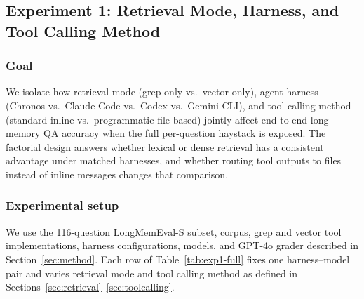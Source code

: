 \documentclass[sigconf,nonacm]{acmart}
\begin{document}
\subsection{Experiment 1: Retrieval Mode, Harness, and Tool Calling Method}
\label{sec:exp1}

 \subsubsection{Goal}
  \label{sec:exp1-goal}
  We isolate how retrieval mode (grep-only vs.\ vector-only), agent harness (Chronos vs.\ Claude Code vs.\ Codex vs.\ Gemini CLI), and tool calling method (standard inline vs.\ programmatic file-based)
  jointly affect end-to-end long-memory QA accuracy when the full per-question haystack is exposed. The factorial design answers whether lexical or dense retrieval has a consistent advantage under matched
   harnesses, and whether routing tool outputs to files instead of inline messages changes that comparison.

\subsubsection{Experimental setup}
\label{sec:exp1-setup}

We use the 116-question LongMemEval-S subset, corpus, grep and vector tool implementations, harness configurations, models, and GPT-4o grader described in Section~\ref{sec:method}. Each row of Table~\ref{tab:exp1-full} fixes one harness--model pair and varies retrieval mode and tool calling method as defined in Sections~\ref{sec:retrieval}--\ref{sec:toolcalling}.
\end{document}
